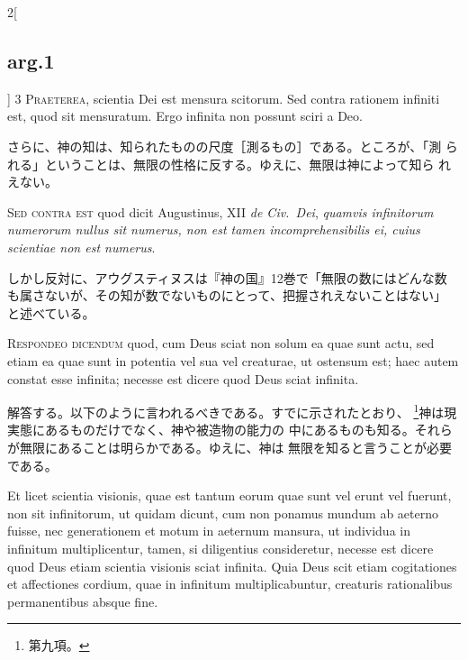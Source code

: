\documentclass[paper=a4paper,fontsize=10pt,jafontsize=9pt,titlepage]{jlreq}
\begin{document}
\begin{paracol}{2}[\subsection{arg.1}]
{\scshape 3 Praeterea}, scientia Dei est mensura scitorum. Sed contra
rationem infiniti est, quod sit mensuratum. Ergo infinita non possunt
sciri a Deo.

\switchcolumn

さらに、神の知は、知られたものの尺度［測るもの］である。ところが、「測
られる」ということは、無限の性格に反する。ゆえに、無限は神によって知ら
れえない。

\switchcolumn*[\subsection{s.c.}]

{\scshape Sed contra est} quod dicit Augustinus, XII {\itshape de
Civ.~Dei}, {\itshape quamvis infinitorum numerorum nullus sit numerus,
non est tamen incomprehensibilis ei, cuius scientiae non est numerus}.

\switchcolumn

しかし反対に、アウグスティヌスは『神の国』12巻で「無限の数にはどんな数
も属さないが、その知が数でないものにとって、把握されえないことはない」
と述べている。


{\scshape Respondeo dicendum} quod, cum Deus sciat non solum ea quae
sunt actu, sed etiam ea quae sunt in potentia vel sua vel creaturae,
ut ostensum est; haec autem constat esse infinita; necesse est dicere
quod Deus sciat infinita.

\switchcolumn

解答する。以下のように言われるべきである。すでに示されたとおり、
\footnote{第九項。}神は現実態にあるものだけでなく、神や被造物の能力の
中にあるものも知る。それらが無限にあることは明らかである。ゆえに、神は
無限を知ると言うことが必要である。

\switchcolumn*

Et licet scientia visionis, quae est tantum eorum quae sunt vel erunt
vel fuerunt, non sit infinitorum, ut quidam dicunt, cum non ponamus
mundum ab aeterno fuisse, nec generationem et motum in aeternum
mansura, ut individua in infinitum multiplicentur, tamen, si
diligentius consideretur, necesse est dicere quod Deus etiam scientia
visionis sciat infinita.  Quia Deus scit etiam cogitationes et
affectiones cordium, quae in infinitum multiplicabuntur, creaturis
rationalibus permanentibus absque fine.


\end{paracol}
\end{document}
